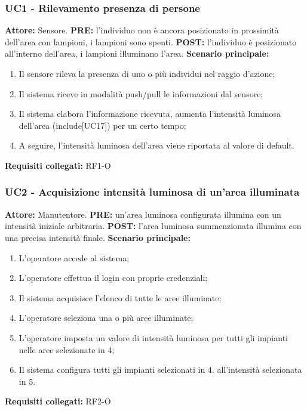 \documentclass[a4paper, 12pt]{article}
\begin{document}
\subsubsection{UC1 - Rilevamento presenza di persone}
\textbf{Attore:} Sensore.\newline
\textbf{PRE:} l'individuo non è ancora posizionato in prossimità dell'area con lampioni, i lampioni sono spenti.\newline
\textbf{POST:} l'individuo è posizionato all'interno dell'area, i lampioni illuminano l'area.\newline
\textbf{Scenario principale:}
\begin{enumerate}
    \item Il sensore rileva la presenza di uno o più individui nel raggio d'azione;
    \item Il sistema riceve in modalità push/pull le informazioni dal sensore;
    \item Il sistema elabora l'informazione ricevuta, aumenta l'intensità luminosa dell'area (include[UC17]) per un certo tempo;
    \item A seguire, l'intensità luminosa dell'area viene riportata al valore di default.
\end{enumerate}
\textbf{Requisiti collegati:} RF1-O\newline

\subsubsection{UC2 - Acquisizione intensità luminosa di un'area illuminata}
\textbf{Attore:} Manutentore.\newline
\textbf{PRE:} un'area luminosa configurata illumina con un intensità iniziale arbitraria.\newline
\textbf{POST:} l'area luminosa summenzionata illumina con una precisa intensità finale.\newline
\textbf{Scenario principale:}
\begin{enumerate}
    \item L'operatore accede al sistema;
    \item L'operatore effettua il login con proprie credenziali;
    \item Il sistema acquisisce l'elenco di tutte le aree illuminate;
    \item L'operatore seleziona una o più aree illuminate;
    \item L'operatore imposta un valore di intensità luminosa per tutti gli impianti nelle aree selezionate in 4;
    \item Il sistema configura tutti gli impianti selezionati in 4. all'intensità selezionata in 5.
\end{enumerate}
\textbf{Requisiti collegati:} RF2-O\newline
\end{document}

